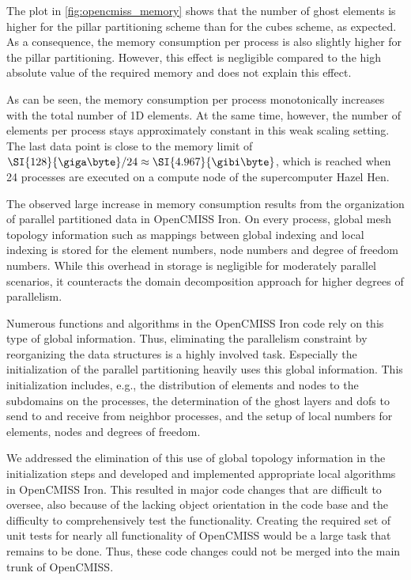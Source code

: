 The plot in \cref{fig:opencmiss_memory} shows that the number of ghost elements is higher for the pillar partitioning scheme than for the cubes scheme, as expected. As a consequence, the memory consumption per process is also slightly higher for the pillar partitioning.
However, this effect is negligible compared to the high absolute value of the required memory and does not explain this effect.

As can be seen, the memory consumption per process monotonically increases with the total number of 1D elements. 
At the same time, however, the number of elements per process stays approximately constant in this weak scaling setting. The last data point is close to the memory limit of $\SI{128}{\giga\byte} / 24 \approx \SI{4.967}{\gibi\byte}$, which is reached when 24 processes are executed on a compute node of the supercomputer Hazel Hen.

The observed large increase in memory consumption results from the organization of parallel partitioned data in OpenCMISS Iron. On every process, global mesh topology information such as mappings between global indexing and local indexing is stored for the element numbers, node numbers and degree of freedom numbers. While this overhead in storage is negligible for moderately parallel scenarios, it counteracts the domain decomposition approach for higher degrees of parallelism. 

Numerous functions and algorithms in the OpenCMISS Iron code rely on this type of global information. Thus, eliminating the parallelism constraint by reorganizing the data structures is a highly involved task. Especially the initialization of the parallel partitioning heavily uses this global information. This initialization includes, e.g., the distribution of elements and nodes to the subdomains on the processes, the determination of the ghost layers and dofs to send to and receive from neighbor processes, and the setup of local numbers for elements, nodes and degrees of freedom.

We addressed the elimination of this use of global topology information in the initialization steps and developed and implemented appropriate local algorithms in OpenCMISS Iron. This resulted in major code changes that are difficult to oversee, also because of the lacking object orientation in the code base and the difficulty to comprehensively test the functionality. Creating the required set of unit tests for nearly all functionality of OpenCMISS would be a large task that remains to be done. Thus, these code changes could not be merged into the main trunk of OpenCMISS.

